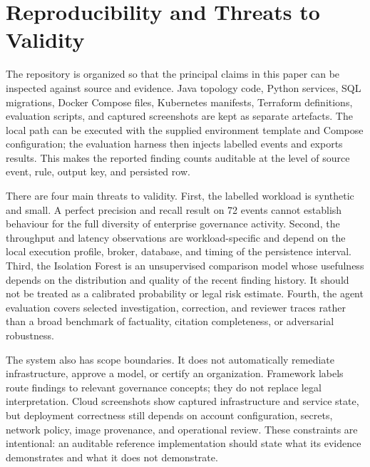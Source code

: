 \documentclass[conference]{IEEEtran}
\begin{document}
\section{Reproducibility and Threats to Validity}
The repository is organized so that the principal claims in this paper can be inspected against source and evidence. Java topology code, Python services, SQL migrations, Docker Compose files, Kubernetes manifests, Terraform definitions, evaluation scripts, and captured screenshots are kept as separate artefacts. The local path can be executed with the supplied environment template and Compose configuration; the evaluation harness then injects labelled events and exports results. This makes the reported finding counts auditable at the level of source event, rule, output key, and persisted row.

There are four main threats to validity. First, the labelled workload is synthetic and small. A perfect precision and recall result on 72 events cannot establish behaviour for the full diversity of enterprise governance activity. Second, the throughput and latency observations are workload-specific and depend on the local execution profile, broker, database, and timing of the persistence interval. Third, the Isolation Forest is an unsupervised comparison model whose usefulness depends on the distribution and quality of the recent finding history. It should not be treated as a calibrated probability or legal risk estimate. Fourth, the agent evaluation covers selected investigation, correction, and reviewer traces rather than a broad benchmark of factuality, citation completeness, or adversarial robustness.

The system also has scope boundaries. It does not automatically remediate infrastructure, approve a model, or certify an organization. Framework labels route findings to relevant governance concepts; they do not replace legal interpretation. Cloud screenshots show captured infrastructure and service state, but deployment correctness still depends on account configuration, secrets, network policy, image provenance, and operational review. These constraints are intentional: an auditable reference implementation should state what its evidence demonstrates and what it does not demonstrate.
\end{document}
